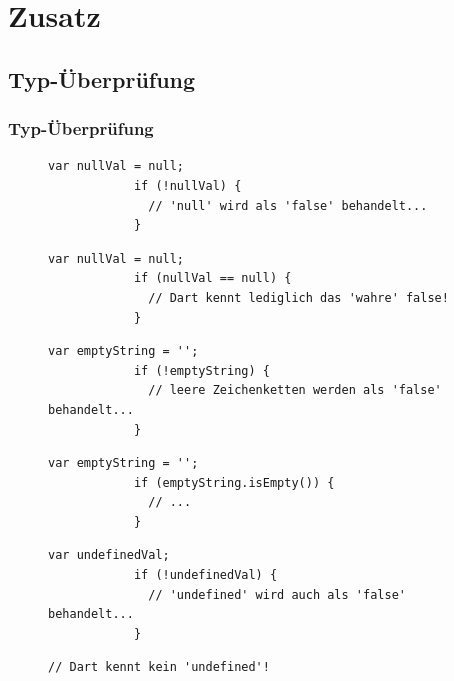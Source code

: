 \documentclass{beamer}
\begin{document}
\section{Zusatz}
\subsection{Typ-Überprüfung}
\begin{frame}[fragile]
\frametitle{Typ-Überprüfung}
\begin{figure}[!h]
	\begin{minipage}{0.49\textwidth}
		\centering
		\begin{lstlisting}[lang=Javascript,basicstyle=\scriptsize]
			var nullVal = null;
			if (!nullVal) {
			  // 'null' wird als 'false' behandelt...
			}
		\end{lstlisting}
	\end{minipage}
	\begin{minipage}{0.49\textwidth}
		\centering
		\begin{lstlisting}[basicstyle=\scriptsize]
			var nullVal = null;
			if (nullVal == null) {
			  // Dart kennt lediglich das 'wahre' false!
			}
		\end{lstlisting}
	\end{minipage}
\end{figure}
\pause
\begin{figure}[!h]
	\begin{minipage}{0.49\textwidth}
		\centering
		\begin{lstlisting}[lang=Javascript,basicstyle=\scriptsize]
			var emptyString = '';
			if (!emptyString) {
			  // leere Zeichenketten werden als 'false' behandelt...
			}
		\end{lstlisting}
	\end{minipage}
	\begin{minipage}{0.49\textwidth}
		\centering
		\begin{lstlisting}[basicstyle=\scriptsize]
			var emptyString = '';
			if (emptyString.isEmpty()) {
			  // ...
			}
		\end{lstlisting}
	\end{minipage}
\end{figure}
\pause
\begin{figure}[!h]
	\begin{minipage}{0.49\textwidth}
		\centering
		\begin{lstlisting}[lang=Javascript,basicstyle=\scriptsize]
			var undefinedVal;
			if (!undefinedVal) {
			  // 'undefined' wird auch als 'false' behandelt...
			}
		\end{lstlisting}
	\end{minipage}
	\begin{minipage}{0.49\textwidth}
		\centering
		\begin{lstlisting}[basicstyle=\scriptsize]
			// Dart kennt kein 'undefined'!
		\end{lstlisting}
	\end{minipage}
\end{figure}
\end{frame}
\end{document}
